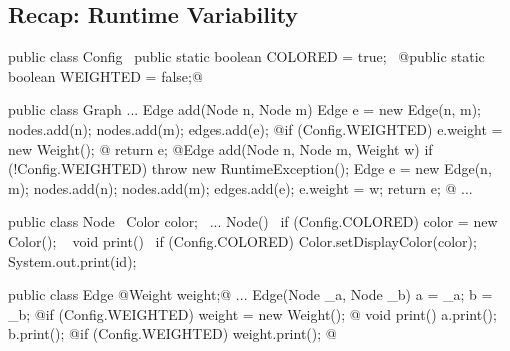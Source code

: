 \subsection{Recap: Runtime Variability}

\begin{frame}[fragile]{\myframetitle}
	\footnotesize
	\begin{mycolumns}[animation=none]
\begin{codetight}{}
public class Config {
	~public static boolean COLORED = true;~
	@public static boolean WEIGHTED = false;@
}
\end{codetight}
\begin{codetight}{}
public class Graph {
	...
	Edge add(Node n, Node m) {
		Edge e = new Edge(n, m);
		nodes.add(n); nodes.add(m); edges.add(e);
		@if (Config.WEIGHTED) { e.weight = new Weight(); }@
		return e;
	}
	@Edge add(Node n, Node m, Weight w) {
		if (!Config.WEIGHTED) { throw new RuntimeException(); }
		Edge e = new Edge(n, m);
		nodes.add(n); nodes.add(m); edges.add(e);
		e.weight = w;
		return e;
	}@
	...
}
\end{codetight}
	\mynextcolumn
\begin{codetight}{}
public class Node {
	~Color color;~
	...
	Node(){
		~if (Config.COLORED) { color = new Color(); }~
	}
	void print() {
		~if (Config.COLORED) { Color.setDisplayColor(color); }~
		System.out.print(id);
	}
}
\end{codetight}
\begin{codetight}{}
public class Edge {
	@Weight weight;@
	...
	Edge(Node _a, Node _b) {
		a = _a; b = _b;
		@if (Config.WEIGHTED) { weight = new Weight(); }@
	}
	void print() {
		a.print(); b.print();
		@if (Config.WEIGHTED) { weight.print(); }@
	}
}
\end{codetight}
	\end{mycolumns}
\end{frame}

